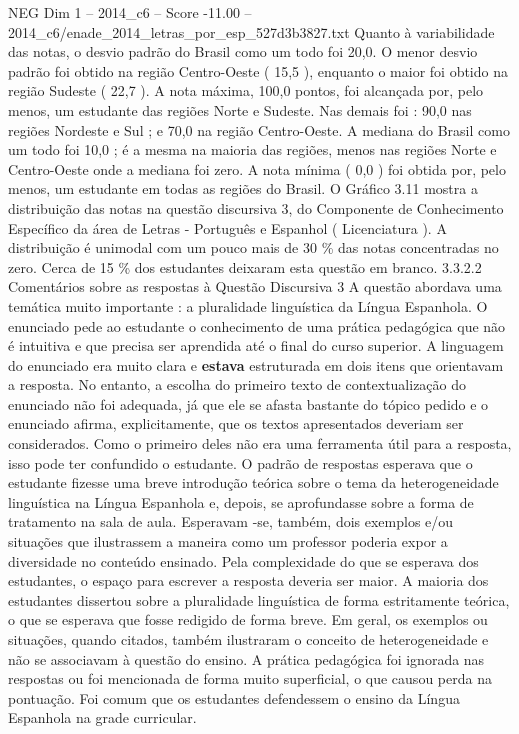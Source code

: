 \begin{textsample}{NEG Dim 1 – 2014\_c6 – Score -11.00 – 2014\_c6/enade\_2014\_letras\_por\_esp\_527d3b3827.txt}
Quanto à variabilidade das notas, o desvio padrão do Brasil como um todo foi 20,0.
O menor desvio padrão foi obtido na região Centro-Oeste ( 15,5 ), enquanto o maior foi obtido na região Sudeste ( 22,7 ).
A nota máxima, 100,0 pontos, foi alcançada por, pelo menos, um estudante das regiões Norte e Sudeste.
Nas demais foi : 90,0 nas regiões Nordeste e Sul ; e 70,0 na região Centro-Oeste.
A mediana do Brasil como um todo foi 10,0 ; é a mesma na maioria das regiões, menos nas regiões Norte e Centro-Oeste onde a mediana foi zero.
A nota mínima ( 0,0 ) foi obtida por, pelo menos, um estudante em todas as regiões do Brasil.
O Gráfico 3.11 mostra a distribuição das notas na questão discursiva 3, do Componente de Conhecimento Específico da área de Letras - Português e Espanhol ( Licenciatura ).
A distribuição é unimodal com um pouco mais de 30 \% das notas concentradas no zero.
Cerca de 15 \% dos estudantes deixaram esta questão em branco. 3.3.2.2 Comentários sobre as respostas à Questão Discursiva 3 A questão abordava uma temática muito importante : a pluralidade linguística da Língua Espanhola.
O enunciado pede ao estudante o conhecimento de uma prática pedagógica que não é intuitiva e que precisa ser aprendida até o final do curso superior.
A linguagem do enunciado era muito clara e \textbf{estava} estruturada em dois itens que orientavam a resposta.
No entanto, a escolha do primeiro texto de contextualização do enunciado não foi adequada, já que ele se afasta bastante do tópico pedido e o enunciado afirma, explicitamente, que os textos apresentados deveriam ser considerados.
Como o primeiro deles não era uma ferramenta útil para a resposta, isso pode ter confundido o estudante.
O padrão de respostas esperava que o estudante fizesse uma breve introdução teórica sobre o tema da heterogeneidade linguística na Língua Espanhola e, depois, se aprofundasse sobre a forma de tratamento na sala de aula.
Esperavam -se, também, dois exemplos e/ou situações que ilustrassem a maneira como um professor poderia expor a diversidade no conteúdo ensinado.
Pela complexidade do que se esperava dos estudantes, o espaço para escrever a resposta deveria ser maior.
A maioria dos estudantes dissertou sobre a pluralidade linguística de forma estritamente teórica, o que se esperava que fosse redigido de forma breve.
Em geral, os exemplos ou situações, quando citados, também ilustraram o conceito de heterogeneidade e não se associavam à questão do ensino.
A prática pedagógica foi ignorada nas respostas ou foi mencionada de forma muito superficial, o que causou perda na pontuação.
Foi comum que os estudantes defendessem o ensino da Língua Espanhola na grade curricular.

\end{textsample}
